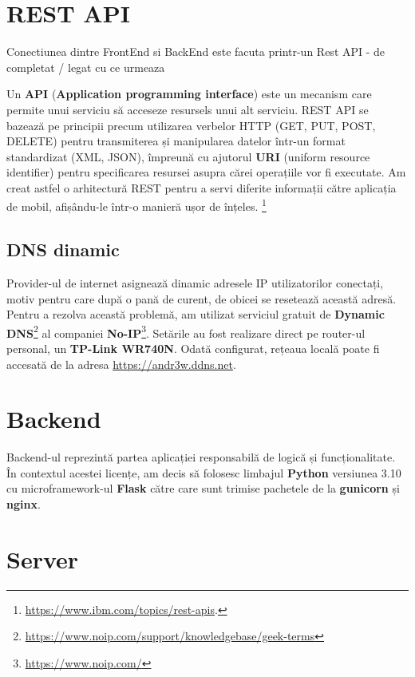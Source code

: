 \section{REST API}
Conectiunea dintre FrontEnd si BackEnd este facuta printr-un Rest API - de completat / legat cu ce urmeaza

Un \textbf{API} (\textbf{Application programming interface}) este un mecanism care permite unui serviciu să acceseze resursels unui alt serviciu. REST API se bazează pe principii precum utilizarea verbelor HTTP (GET, PUT, POST, DELETE) pentru transmiterea și manipularea datelor într-un format standardizat (XML, JSON), împreună cu ajutorul \textbf{URI} (uniform resource identifier) pentru specificarea resursei asupra cărei operațiile vor fi executate. Am creat astfel o arhitectură REST pentru a servi diferite informații către aplicația de mobil, afișându-le într-o manieră ușor de înțeles. \footnote{\url{https://www.ibm.com/topics/rest-apis}.}

\subsection{DNS dinamic}

Provider-ul de internet asignează dinamic adresele IP utilizatorilor conectați, motiv pentru care după o pană de curent, de obicei se resetează această adresă. Pentru a rezolva această problemă, am utilizat serviciul gratuit de \textbf{Dynamic DNS}\footnote{\url{https://www.noip.com/support/knowledgebase/geek-terms}} al companiei \textbf{No-IP}\footnote{\url{https://www.noip.com/}}. Setările au fost realizare direct pe router-ul personal, un \textbf{TP-Link WR740N}. Odată configurat, rețeaua locală poate fi accesată de la adresa \url{https://andr3w.ddns.net}.

\section{Backend}

Backend-ul reprezintă partea aplicației responsabilă de logică și funcționalitate. În contextul acestei licențe, am decis să folosesc limbajul \textbf{Python} versiunea 3.10 cu microframework-ul \textbf{Flask} către care sunt trimise pachetele de la \textbf{gunicorn} și \textbf{nginx}.

\section{Server}

